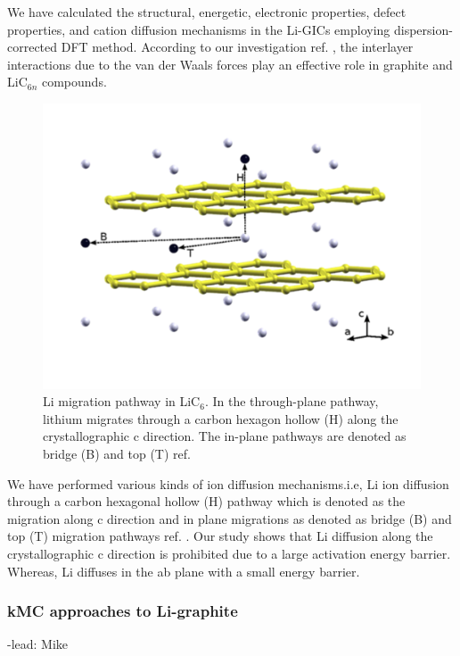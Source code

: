 \documentclass[journal=jacsat,manuscript=article]{achemso}
\begin{document}
We have calculated the structural, energetic, electronic properties, defect properties, and cation diffusion mechanisms in the Li-GICs employing dispersion-corrected DFT method. According to our investigation ref. , the interlayer interactions due to the van der Waals forces play an effective role in graphite and LiC$_{6n}$ compounds. 

\begin{figure}
    \centering           
    \includegraphics[scale=0.8]{figures/Islam-Fig-LiC6.png}
    \caption{Li migration pathway in LiC$_{6}$. In the through-plane pathway, lithium migrates through a carbon hexagon hollow (H) along the crystallographic c direction. The in-plane pathways are denoted as bridge (B) and top (T) ref. }
    \label{fig:Rl}
\end{figure}
        
We have performed various kinds of ion diffusion mechanisms.i.e, Li ion diffusion through a carbon hexagonal hollow (H) pathway which is denoted as the migration along c direction and in plane migrations as denoted as bridge (B) and top (T) migration pathways ref. . Our study shows that Li diffusion along the crystallographic c direction is prohibited due to a large activation energy barrier. Whereas, Li diffuses in the ab plane with a small energy barrier.

\subsubsection{kMC approaches to Li-graphite}
\label{sec:anodes_kmc}
-lead: Mike
\end{document}
